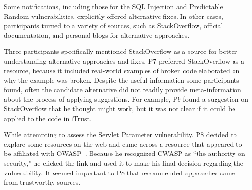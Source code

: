 \documentclass{acm_proc_article-sp}
\begin{document}
 
Some notifications, including those for the SQL Injection and Predictable Random vulnerabilities, explicitly offered alternative fixes. 
In other cases, participants turned to a variety of sources, such as StackOverflow, official documentation, and personal blogs for alternative approaches.
 
Three participants specifically mentioned StackOverflow as a source for better understanding alternative approaches and fixes. 
P7 preferred StackOverflow as a resource, because it included real-world examples of broken code elaborated on why the example was broken.
Despite the useful information some participants found, often the candidate alternative did not readily provide meta-information about the process of applying suggestions. 
For example, P9 found a suggestion on StackOverflow that he thought might work, but it was not clear if it could be applied to the code in iTrust.

While attempting to assess the Servlet Parameter vulnerability, P8 decided to explore some resources on the web and came across a resource that appeared to be affiliated with OWASP~\cite{OWASP}. 
Because he recognized OWASP as ``the authority on security,'' he clicked the link and used it to make his final decision regarding the vulnerability. 
It seemed important to P8 that recommended approaches came from trustworthy sources.





\end{document}
